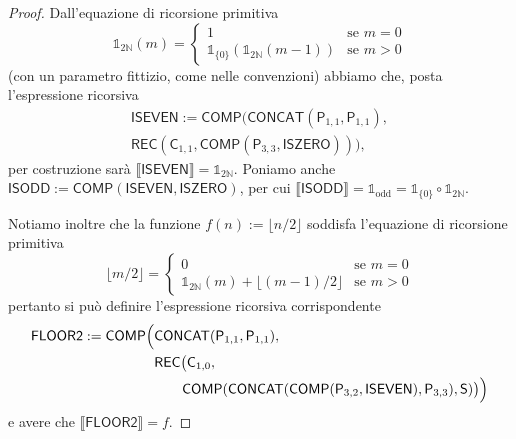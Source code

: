 \begin{proof}
Dall'equazione di ricorsione primitiva
\[
\mathbb 1_{2\mathbb N}(m)=\begin{cases}1 & \text{se } m=0\\ \mathbb 1_{\{0\}}(\mathbb 1_{2\mathbb N}(m-1)) & \text{se } m>0\end{cases}
\]
(con un parametro fittizio, come nelle convenzioni) abbiamo che, posta l'espressione ricorsiva
\[
\begin{aligned}
\mathsf{ISEVEN}:=\mathsf{COMP}\bigl(\mathsf{CONCAT}(\mathsf P_{1,1},\mathsf P_{1,1}),\\
\mathsf{REC}(\mathsf C_{1,1},\mathsf{COMP}(\mathsf P_{3,3},\mathsf{ISZERO}))\bigr),
\end{aligned}
\]
per costruzione sarà $\llbracket\mathsf{ISEVEN}\rrbracket=\mathbb 1_{2\mathbb N}$. Poniamo anche $\mathsf{ISODD}:=\mathsf{COMP}(\mathsf{ISEVEN},\mathsf{ISZERO})$, per cui $\llbracket\mathsf{ISODD}\rrbracket=\mathbb 1_{\mathrm{odd}}=\mathbb 1_{\{0\}}\circ\mathbb 1_{2\mathbb N}$.

Notiamo inoltre che la funzione $f(n):=\lfloor n/2\rfloor$ soddisfa l'equazione di ricorsione primitiva
\[
\lfloor m/2\rfloor=\begin{cases}0 & \text{se } m=0\\ \mathbb 1_{2\mathbb N}(m)+\lfloor(m-1)/2\rfloor & \text{se } m>0\end{cases}
\]
pertanto si può definire l'espressione ricorsiva corrispondente
\[
\begin{aligned}
\mathsf{FLOOR2}:=\mathsf{COMP}\Bigl(&\mathsf{CONCAT}(\mathsf P_{1,1},\mathsf P_{1,1}),\\
&\mathsf{REC}\bigl(\mathsf C_{1,0},\\&\qquad\mathsf{COMP}(\mathsf{CONCAT}(\mathsf{COMP}(\mathsf P_{3,2},\mathsf{ISEVEN}),\mathsf P_{3,3}),\mathsf S)\bigr)\Bigr)
\end{aligned}
\]
e avere che $\llbracket\mathsf{FLOOR2}\rrbracket=f$.


\end{proof}
